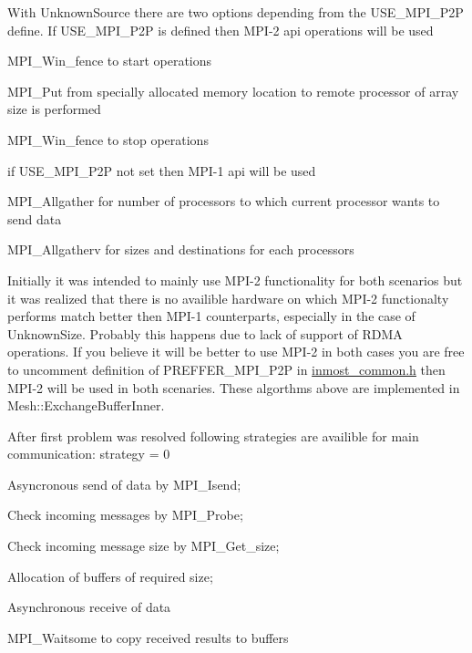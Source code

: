 With Unknown\-Source there are two options depending from the U\-S\-E\-\_\-\-M\-P\-I\-\_\-\-P2\-P define. If U\-S\-E\-\_\-\-M\-P\-I\-\_\-\-P2\-P is defined then M\-P\-I-\/2 api operations will be used
\begin{DoxyEnumerate}
\item M\-P\-I\-\_\-\-Win\-\_\-fence to start operations
\item M\-P\-I\-\_\-\-Put from specially allocated memory location to remote processor of array size is performed
\item M\-P\-I\-\_\-\-Win\-\_\-fence to stop operations
\end{DoxyEnumerate}

if U\-S\-E\-\_\-\-M\-P\-I\-\_\-\-P2\-P not set then M\-P\-I-\/1 api will be used
\begin{DoxyEnumerate}
\item M\-P\-I\-\_\-\-Allgather for number of processors to which current processor wants to send data
\item M\-P\-I\-\_\-\-Allgatherv for sizes and destinations for each processors
\end{DoxyEnumerate}

Initially it was intended to mainly use M\-P\-I-\/2 functionality for both scenarios but it was realized that there is no availible hardware on which M\-P\-I-\/2 functionalty performs match better then M\-P\-I-\/1 counterparts, especially in the case of Unknown\-Size. Probably this happens due to lack of support of R\-D\-M\-A operations. If you believe it will be better to use M\-P\-I-\/2 in both cases you are free to uncomment definition of P\-R\-E\-F\-F\-E\-R\-\_\-\-M\-P\-I\-\_\-\-P2\-P in \hyperlink{inmost__common_8h_source}{inmost\-\_\-common.\-h} then M\-P\-I-\/2 will be used in both scenaries. These algorthms above are implemented in Mesh\-::\-Exchange\-Buffer\-Inner.

After first problem was resolved following strategies are availible for main communication\-: strategy = 0
\begin{DoxyEnumerate}
\item Asyncronous send of data by M\-P\-I\-\_\-\-Isend;
\item Check incoming messages by M\-P\-I\-\_\-\-Probe;
\item Check incoming message size by M\-P\-I\-\_\-\-Get\-\_\-size;
\item Allocation of buffers of required size;
\item Asynchronous receive of data
\item M\-P\-I\-\_\-\-Waitsome to copy received results to buffers
\end{DoxyEnumerate}

